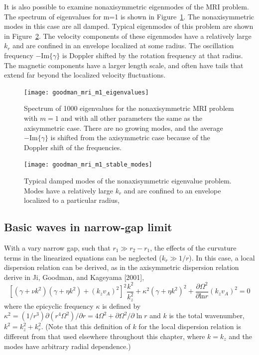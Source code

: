 \documentclass[letterpaper]{article}
\begin{document}
It is also possible to examine nonaxisymmetric eigenmodes of the MRI
problem. The spectrum of eigenvalues for m=1 is shown in
Figure~\ref{fig:globalcode:goodman_mri_m1_eigenvalues}.  The
nonaxisymmetric modes in this case are all damped.  Typical eigenmodes
of this problem are shown in
Figure~\ref{fig:globalcode:goodman_mri_m1_stable_modes}.  The velocity
components of these eigenmodes have a relatively large $k_r$ and are
confined in an envelope localized at some radius. The oscillation
frequency $-\mathrm{Im}\{\gamma\}$ is Doppler shifted by the rotation
frequency at that radius. The magnetic components have a larger length
scale, and often have tails that extend far beyond the localized
velocity fluctuations.

\begin{figure}
\centering
\texttt{[image: goodman\_mri\_m1\_eigenvalues]}
\caption[Eigenvalue spectrum for nonaxisymmetric MRI problem]{Spectrum
  of 1000 eigenvalues for the nonaxisymmetric MRI problem with $m=1$
  and with all other parameters the same as the axisymmetric
  case. There are no growing modes, and the average
  $-\mathrm{Im}\{\gamma\}$ is shifted from the axisymmetric case
  because of the Doppler shift of the frequencies.}
\label{fig:globalcode:goodman_mri_m1_eigenvalues}
\end{figure}

\begin{figure}
\centering
\texttt{[image: goodman\_mri\_m1\_stable\_modes]}
\caption[Damped eigenmodes of the nonaxisymmetric MRI problem]{Typical
  damped modes of the nonaxisymmetric eigenvalue problem. Modes have a
  relatively large $k_r$ and are confined to an envelope localized to
  a particular radius, }
\label{fig:globalcode:goodman_mri_m1_stable_modes}
\end{figure}



\subsection{Basic waves in narrow-gap limit}

With a vary narrow gap, such that $r_1 \gg r_2 - r_1$, the effects of
the curvature terms in the linearized equations can be neglected ($k_r
\gg 1/r$). In this case, a local dispersion relation can be derived, as
in the axisymmetric dispersion relation derive in Ji, Goodman, and
Kageyama [2001],
\begin{equation}
\left[(\gamma + \nu k^2)(\gamma + \eta k^2) 
      + (k_zv_A)^2\right]^2\frac{k^2}{k_z^2}
+ \kappa^2(\gamma + \eta k^2)^2
+ \frac{\partial \Omega^2}{\partial \mathrm{ln} r}(k_z v_A)^2 = 0
\end{equation}
where the epicyclic frequency $\kappa$ is defined by
$\kappa^2=(1/r^3)\partial(r^4\Omega^2)/\partial r = 4\Omega^2 +
\partial \Omega^2/\partial \ln r$ and $k$ is the total wavenumber,
$k^2 = k_z^2 + k_r^2$. (Note that this definition of $k$ for the local
dispersion relation is different from that used elsewhere throughout
this chapter, where $k=k_z$ and the modes have arbitrary radial
dependence.)
\end{document}
